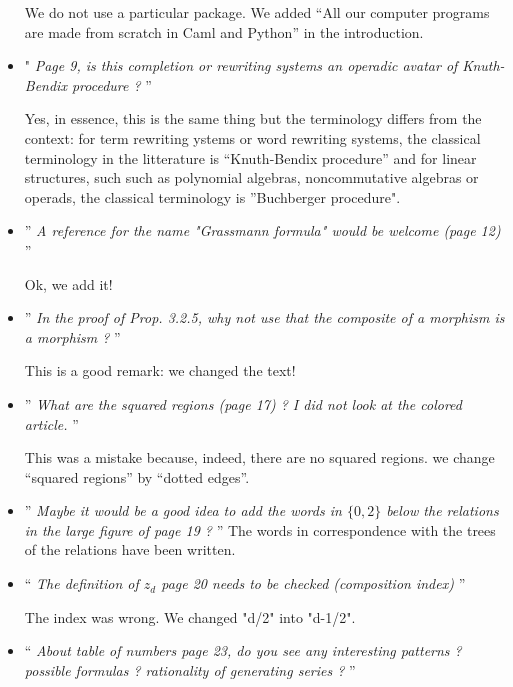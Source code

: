 \documentclass[10pt,reqno]{amsart}
\numberwithin{equation}{subsection}
\begin{document}
\begin{itemize}
We do not use a particular package. We added
``All our computer programs are made from scratch in {\sc Caml}
and {\sc Python}'' in the introduction.
\medbreak

\item "{\it
  Page 9, is this completion or rewriting systems an operadic avatar of
  Knuth-Bendix procedure ?
}''
  \smallbreak

 Yes, in essence, this is the same thing but the terminology differs from
 the context: for term rewriting ystems or word rewriting systems, the
 classical terminology in the litterature is ``Knuth-Bendix procedure''
 and for linear structures, such  such as polynomial algebras,
 noncommutative algebras or operads, the classical terminology is
 ''Buchberger procedure".
 \medbreak

\item ''{\it
  A reference for the name "Grassmann formula" would be welcome (page 12)
}''
  \smallbreak

  Ok, we add it!
  \medbreak

\item ''{\it
  In the proof of Prop. 3.2.5, why not use that the composite of a
  morphism is a morphism ?
}''
  \smallbreak

  This is a good remark: we changed the text!
  \medbreak

\item ''{\it
What are the squared regions (page 17) ? I did not look at the colored article.
}''
  \smallbreak

  This was a mistake because, indeed, there are no squared regions. we
  change ``squared regions'' by ``dotted edges''.
  \medbreak

  \item ''{\it
Maybe it would be a good idea to add the words in $\{0,2\}$ below the relations in the large figure of page 19 ?
}''
  \smallbreak
  The words in correspondence with the trees of the relations have been
  written.
  \medbreak


\item `` {\it
The definition of $z_d$ page 20 needs to be checked (composition index)
}''
\smallbreak

The index was wrong. We changed "d/2" into "d-1/2".
\medbreak

\item `` {\it
About table of numbers page 23, do you see any interesting patterns ?
possible formulas ? rationality of generating series ?
}''
\smallbreak


\end{itemize}
\end{document}
